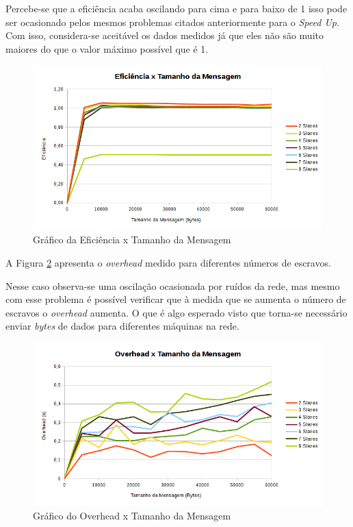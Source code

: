 \documentclass[
	12pt,				%
    oneside,			%
	a4paper,			%
	english,			%
	brazil,				%
	]{abntex2}
\begin{document}
Percebe-se que a eficiência acaba oscilando para cima e para baixo de 1 isso pode ser ocasionado pelos mesmos problemas citados anteriormente para o \textit{Speed Up}. Com isso, considera-se aceitável os dados medidos já que eles não são muito
maiores do que o valor máximo possível que é 1.


\begin{figure}[!htb]
\centering
\includegraphics[scale=0.65]{figuras/eficiencia_distribuido.png}
\caption{Gráfico da Eficiência x Tamanho da Mensagem}
\label{fig:dist:eficienciaXtamanho_msg}
\end{figure}

A Figura \ref{fig:dist:overheadXtamanho_msg} apresenta o \textit{overhead} medido para diferentes números de escravos. 

Nesse caso observa-se uma oscilação ocasionada por ruídos da rede, mas mesmo com esse problema é possível verificar que à
medida que se aumenta o número de escravos o \textit{overhead} aumenta. O que é algo esperado visto que torna-se necessário 
enviar \textit{bytes} de dados para diferentes máquinas na rede.

\begin{figure}[!htb]
\centering
\includegraphics[scale=0.65]{figuras/overhead_distribuido.png}
\caption{Gráfico do Overhead x Tamanho da Mensagem}
\label{fig:dist:overheadXtamanho_msg}
\end{figure}
\end{document}
